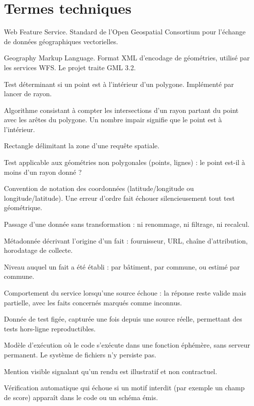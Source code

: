 \section{Termes techniques}

\begin{description}[leftmargin=0em,style=nextline]
  \item[WFS.] Web Feature Service. Standard de l'Open Geospatial Consortium
  pour l'échange de données géographiques vectorielles.
  \item[GML.] Geography Markup Language. Format XML d'encodage de géométries,
  utilisé par les services WFS. Le projet traite GML 3.2.
  \item[Point-in-polygon.] Test déterminant si un point est à l'intérieur d'un
  polygone. Implémenté par lancer de rayon.
  \item[Lancer de rayon.] Algorithme consistant à compter les intersections
  d'un rayon partant du point avec les arêtes du polygone. Un nombre impair
  signifie que le point est à l'intérieur.
  \item[Boîte englobante (BBOX).] Rectangle délimitant la zone d'une requête
  spatiale.
  \item[Proximité géométrique.] Test applicable aux géométries non polygonales
  (points, lignes) : le point est-il à moins d'un rayon donné ?
  \item[Ordre des axes.] Convention de notation des coordonnées
  (latitude/longitude ou longitude/latitude). Une erreur d'ordre fait échouer
  silencieusement tout test géométrique.
  \item[Verbatim.] Passage d'une donnée sans transformation : ni renommage, ni
  filtrage, ni recalcul.
  \item[Provenance.] Métadonnée décrivant l'origine d'un fait : fournisseur,
  URL, chaîne d'attribution, horodatage de collecte.
  \item[Résolution.] Niveau auquel un fait a été établi : par bâtiment, par
  commune, ou estimé par commune.
  \item[Mode dégradé.] Comportement du service lorsqu'une source échoue : la
  réponse reste valide mais partielle, avec les faits concernés marqués comme
  inconnus.
  \item[Fixture.] Donnée de test figée, capturée une fois depuis une source
  réelle, permettant des tests hors-ligne reproductibles.
  \item[Serverless.] Modèle d'exécution où le code s'exécute dans une fonction
  éphémère, sans serveur permanent. Le système de fichiers n'y persiste pas.
  \item[Étiquetage.] Mention visible signalant qu'un rendu est illustratif et
  non contractuel.
  \item[Porte de recherche (\emph{grep gate}).] Vérification automatique qui
  échoue si un motif interdit (par exemple un champ de score) apparaît dans le
  code ou un schéma émis.
\end{description}

